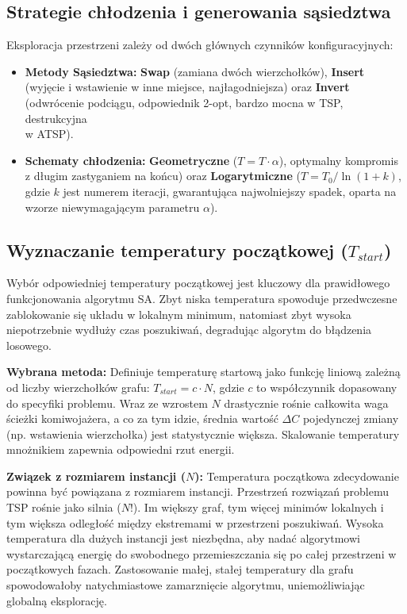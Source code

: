 \documentclass[conference]{IEEEtran}
\begin{document}
        \subsection{Strategie chłodzenia i generowania sąsiedztwa}
            Eksploracja przestrzeni zależy od dwóch głównych czynników konfiguracyjnych:
            \begin{itemize}
                \item \textbf{Metody Sąsiedztwa:} \textbf{Swap} (zamiana dwóch wierzchołków), \textbf{Insert} (wyjęcie i wstawienie w inne miejsce, najłagodniejsza) oraz \textbf{Invert} (odwrócenie podciągu, odpowiednik 2-opt, bardzo mocna w TSP, destrukcyjna \\ w ATSP).
                \item \textbf{Schematy chłodzenia:} \textbf{Geometryczne} ($T = T \cdot \alpha$), optymalny kompromis z długim zastyganiem na końcu) oraz \textbf{Logarytmiczne} ($T = T_0 / \ln(1+k)$, gdzie $k$ jest numerem iteracji, gwarantująca najwolniejszy spadek, oparta na wzorze niewymagającym parametru $\alpha$).
            \end{itemize}
        \subsection{Wyznaczanie temperatury początkowej ($T_{start}$)}
            Wybór odpowiedniej temperatury początkowej jest kluczowy dla prawidłowego funkcjonowania algorytmu SA. Zbyt niska temperatura spowoduje przedwczesne zablokowanie się układu w lokalnym minimum, natomiast zbyt wysoka niepotrzebnie wydłuży czas poszukiwań, degradując algorytm do błądzenia losowego.
            
            \textbf{Wybrana metoda:} Definiuje temperaturę startową jako funkcję liniową zależną od liczby wierzchołków grafu: $T_{start} = c \cdot N$, gdzie $c$ to współczynnik dopasowany do specyfiki problemu. Wraz ze wzrostem $N$ drastycznie rośnie całkowita waga ścieżki komiwojażera, a co za tym idzie, średnia wartość $\Delta C$ pojedynczej zmiany (np. wstawienia wierzchołka) jest statystycznie większa. Skalowanie temperatury mnożnikiem zapewnia odpowiedni rzut energii.
            
            \textbf{Związek z rozmiarem instancji ($N$):} Temperatura początkowa zdecydowanie powinna być powiązana z rozmiarem instancji. Przestrzeń rozwiązań problemu TSP rośnie jako silnia ($N!$). Im większy graf, tym więcej minimów lokalnych i tym większa odległość między ekstremami w przestrzeni poszukiwań. Wysoka temperatura dla dużych instancji jest niezbędna, aby nadać algorytmowi wystarczającą energię do swobodnego przemieszczania się po całej przestrzeni w początkowych fazach. Zastosowanie małej, stałej temperatury dla grafu spowodowałoby natychmiastowe zamarznięcie algorytmu, uniemożliwiając globalną eksplorację.
\end{document}
